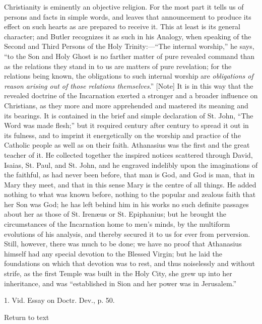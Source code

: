 Christianity is eminently an objective religion. For the most part it
tells us of persons and facts in simple words, and leaves that
announcement to produce its effect on such hearts as are prepared to
receive it. This at least is its general character; and Butler
recognizes it as such in his Analogy, when speaking of the Second and
Third Persons of the Holy Trinity:—``The internal worship,''
he says, ``to the Son and Holy Ghost is no farther matter of pure
revealed command than as the relations they stand in to us are
matters of pure revelation; for the relations being known, the
obligations to such internal worship are \emph{obligations of reason
arising out of those relations themselves}.'' [Note]
It is in this way that the revealed doctrine of the Incarnation exerted
a stronger and a broader influence on Christians, as they more and more
apprehended and mastered its meaning and its bearings. It is contained
in the brief and simple declaration of St. John, ``The Word was made
flesh;'' but it required century after century to spread it out in
its fulness, and to imprint it energetically on the worship and practice
of the Catholic people as well as on their faith. Athanasius was the
first and the great teacher of it. He collected together the inspired
notices scattered through David, Isaias, St. Paul, and St. John, and he
engraved indelibly upon the imaginations of the faithful, as had never
been before, that man is God, and God is man, that in Mary they meet,
and that in this sense Mary is the centre of all things. He added
nothing to what was known before, nothing to the popular and zealous
faith that her Son was God; he has left behind him in his works no such
definite passages about her as those of St. Irenæus or St. Epiphanius;
but he brought the circumstances of the Incarnation home to men's minds,
by the multiform evolutions of his analysis, and thereby secured it to
us for ever from perversion. Still, however, there was much to be done;
we have no proof that Athanasius himself had any special devotion
to the Blessed Virgin; but he laid the foundations on which that
devotion was to rest, and thus noiselessly and without strife, as the
first Temple was built in the Holy City, she grew up into her
inheritance, and was ``established in Sion and her power was in
Jerusalem.''


1. Vid. Essay on Doctr. Dev., p. 50.

Return to text



